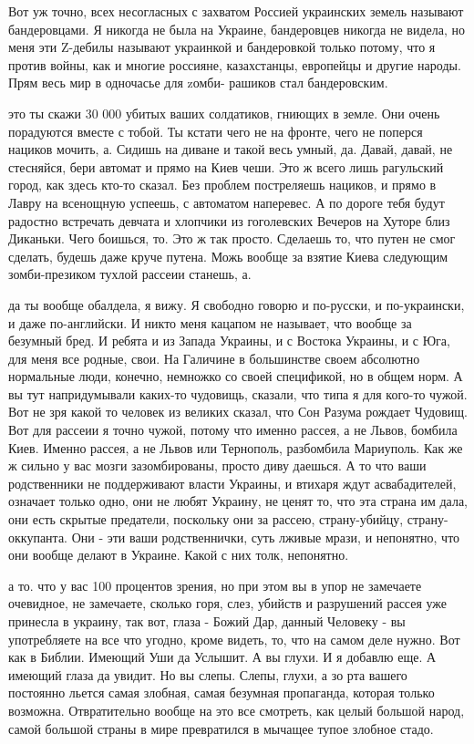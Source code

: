 Вот уж точно, всех несогласных с захватом Россией украинских земель называют
бандеровцами. Я никогда не была на Украине, бандеровцев никогда не видела, но
меня эти Z-дебилы называют украинкой и бандеровкой только потому, что я против
войны, как и многие россияне, казахстанцы, европейцы и другие народы. Прям весь
мир в одночасье для zомби- рашиков стал бандеровским.

это ты скажи 30 000 убитых ваших солдатиков, гниющих в земле. Они очень
порадуются вместе с тобой. Ты кстати чего не на фронте, чего не поперся нациков
мочить, а. Сидишь на диване и такой весь умный, да. Давай, давай, не стесняйся,
бери автомат и прямо на Киев чеши. Это ж всего лишь рагульский город, как здесь
кто-то сказал. Без проблем постреляешь нациков, и прямо в Лавру на всенощную
успеешь, с автоматом наперевес. А по дороге тебя будут радостно встречать
девчата и хлопчики из гоголевских Вечеров на Хуторе близ Диканьки. Чего
боишься, то. Это ж так просто. Сделаешь то, что путен не смог сделать, будешь
даже круче путена. Можь вообще за взятие Киева следующим зомби-презиком тухлой
рассеии станешь, а.

да ты вообще обалдела, я вижу. Я свободно говорю и по-русски, и по-украински, и
даже по-английски. И никто меня кацапом не называет, что вообще за безумный
бред. И ребята и из Запада Украины, и с Востока Украины, и с Юга, для меня все
родные, свои. На Галичине в большинстве своем абсолютно нормальные люди,
конечно, немножко со своей спецификой, но в общем норм. А вы тут напридумывали
каких-то чудовищь, сказали, что типа я для кого-то чужой. Вот не зря какой то
человек из великих сказал, что Сон Разума рождает Чудовищ. Вот для рассеии я
точно чужой, потому что именно рассея, а не Львов, бомбила Киев. Именно рассея,
а не Львов или Тернополь, разбомбила Мариуполь. Как же ж сильно у вас мозги
зазомбированы, просто диву даешься. А то что ваши родственники не поддерживают
власти Украины, и втихаря ждут асвабадителей, означает только одно, они не
любят Украину, не ценят то, что эта страна им дала, они есть скрытые предатели,
поскольку они за рассею, страну-убийцу, страну-оккупанта. Они - эти ваши
родственнички, суть лживые мрази, и непонятно, что они вообще делают в Украине.
Какой с них толк, непонятно.

а то. что у вас 100 процентов зрения, но при этом вы в упор не замечаете
очевидное, не замечаете, сколько горя, слез, убийств и разрушений рассея уже
принесла в украину, так вот, глаза - Божий Дар, данный Человеку - вы
употребляете на все что угодно, кроме видеть, то, что на самом деле нужно. Вот
как в Библии. Имеющий Уши да Услышит. А вы глухи. И я добавлю еще. А имеющий
глаза да увидит. Но вы слепы. Слепы, глухи, а зо рта вашего постоянно льется
самая злобная, самая безумная пропаганда, которая только возможна.
Отвратительно вообще на это все смотреть, как целый большой народ, самой
большой страны в мире превратился в мычащее тупое злобное стадо.

